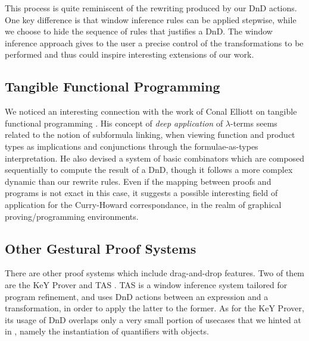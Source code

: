 This process is quite reminiscent of the rewriting produced by our DnD
actions.  One key difference is that window inference rules can be
applied stepwise, while we choose to hide the sequence of rules that
justifies a DnD. The window inference approach gives to the user a
precise control of the transformations to be performed and thus could
inspire interesting extensions of our work.


\subsection*{Tangible Functional Programming}

We noticed an interesting connection with the work of Conal Elliott on
tangible functional programming . His concept
of \emph{deep application} of $\lambda$-terms seems related to the
notion of subformula linking, when viewing function and product types
as implications and conjunctions through the formulae-as-types
interpretation. He also devised a system of basic combinators which
are composed sequentially to compute the result of a DnD, though it
follows a more complex dynamic than our rewrite rules. Even if the
mapping between proofs and programs is not exact in this case, it
suggests a possible interesting field of application for the
Curry-Howard correspondance, in the realm of graphical
proving/programming environments.

\subsection*{Other Gestural Proof Systems}

There are other proof systems which include drag-and-drop features. Two of them
are the KeY Prover  and TAS
. TAS is a window inference system tailored for program
refinement, and uses DnD actions between an expression and a transformation, in
order to apply the latter to the former.
As for the KeY Prover, its usage of DnD overlaps only a very small
portion of usecases that we hinted at in , namely
the instantiation of quantifiers with objects.

